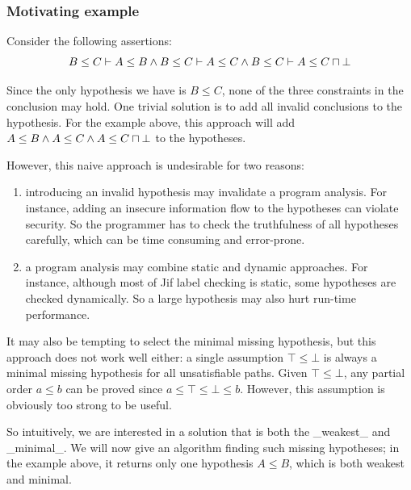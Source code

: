 \subsubsection{Motivating example}

Consider the following assertions: 
%
\[B\leq C \vdash A\leq B \land B\leq C \vdash A\leq C \land B\leq C
\vdash A\leq C\sqcap \bot \]

Since the only hypothesis we have is $B\leq C$, none of the three
constraints in the conclusion may hold. 
%
One trivial solution is to add all invalid conclusions to the
hypothesis. For the example above, this approach will add $A\leq B
\land A\leq C \land A\leq C\sqcap \bot$ to the hypotheses.

However, this naive approach is undesirable for two reasons: 
%
\begin{enumerate}
\item introducing an invalid hypothesis may invalidate a program
analysis. For instance, adding an insecure information flow to the
hypotheses can violate security. So the programmer has to check
the truthfulness of all hypotheses carefully, which can be time
consuming and error-prone.

\item a program analysis may combine static and dynamic
approaches. For instance, although most of Jif label checking is
static, some hypotheses are checked dynamically. So a large hypothesis
may also hurt run-time performance.
\end{enumerate}

It may also be tempting to select the minimal missing hypothesis,
but this approach does not work well either: a single assumption
$\top\leq \bot$ is always a minimal missing hypothesis for all
unsatisfiable paths. Given $\top\leq \bot$, any
partial order $a \leq b$ can be proved since $a\leq \top\leq \bot\leq
b$. However, this assumption is obviously too strong to be useful.

So intuitively, we are interested in a solution that is both the
_weakest_ and _minimal_. We will now give an algorithm finding such
missing hypotheses; in the example above, it returns only one
hypothesis $A\leq B$, which is both weakest and minimal.
%
% 
% 
% 
% 
